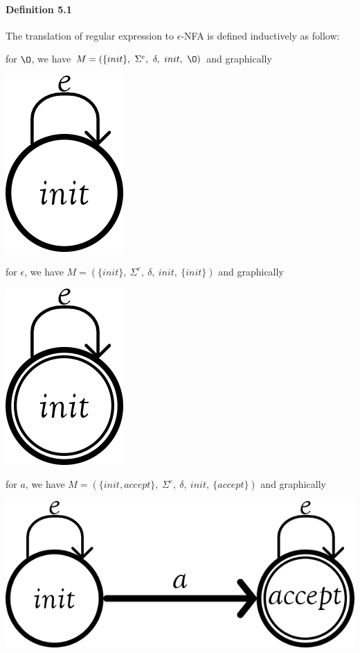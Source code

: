 \documentclass[twoside,openright,final]{bhamthesis}
\renewcommand{\item}{\itemindent0.5cm\itemold}
\begin{document}
\paragraph{Definition 5.1} The translation of regular expression to
\(\epsilon\)-NFA is defined inductively as follow:
\begin{enumerate}[nolistsep]
  \item for \(\O\), we have \(M = (\{init\},\ \Sigma^e,\ \delta,\
    init,\ \O)\) and graphically \begin{center}\includegraphics{null}\end{center}
  \item for \(\epsilon\), we have \(M = (\{init\},\ \Sigma^e,\
    \delta,\ init,\ \{init\})\) and graphically \begin{center}\includegraphics{epsilon}\end{center}
  \item for \(a\), we have \(M = (\{init, accept\},\ \Sigma^e,\
    \delta,\ init,\ \{accept\})\) and graphically \begin{center}\includegraphics{singleton}\end{center}

\end{enumerate}
\end{document}
